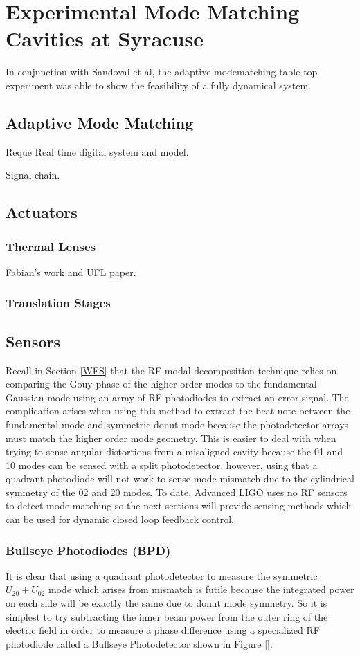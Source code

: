 \chapter{Experimental Mode Matching Cavities at Syracuse}
In conjunction with Sandoval et al, the adaptive modematching table top experiment was able to show the feasibility of a fully dynamical system.
	\section{Adaptive Mode Matching}
	Reque
	Real time digital system and model.
	
	Signal chain.
	
	\section{Actuators}
		\subsection{Thermal Lenses}
		Fabian's work and UFL paper.
		\subsection{Translation Stages}
		
	\section{Sensors}
	Recall in Section \ref{WFS} that the RF modal decomposition technique relies on comparing the Gouy phase of the higher order modes to the fundamental Gaussian mode using an array of RF photodiodes to extract an error signal. 
	The complication arises when using this method to extract the beat note between the fundamental mode and symmetric donut mode because the photodetector arrays must match the higher order mode geometry.  
	This is easier to deal with when trying to sense angular distortions from a misaligned cavity because the 01 and 10 modes can be sensed with a split photodetector, however, using that a quadrant photodiode will not work to sense mode mismatch due to the cylindrical symmetry of the 02 and 20 modes. 
	To date, Advanced LIGO uses no RF sensors to detect mode matching so the next sections will provide sensing methods which can be used for dynamic closed loop feedback control.
	
		\subsection{Bullseye Photodiodes (BPD)}
		It is clear that using a quadrant photodetector to measure the symmetric $U_{20} + U_{02}$ mode which arises from mismatch is futile because the integrated power on each side will be exactly the same due to donut mode symmetry. So it is simplest to try subtracting the inner beam power from the outer ring of the electric field in order to measure a phase difference using a specialized RF photodiode called a Bullseye Photodetector shown in Figure []. 
		
